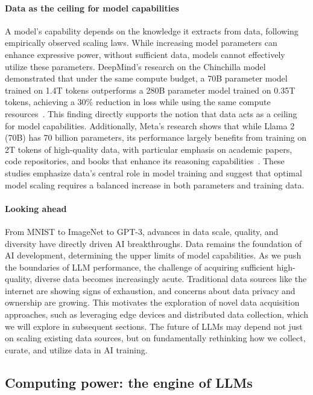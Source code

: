 \paragraph{Data as the ceiling for model capabilities}
A model's capability depends on the knowledge it extracts from data, following empirically observed scaling laws. While increasing model parameters can enhance expressive power, without sufficient data, models cannot effectively utilize these parameters. DeepMind's research on the Chinchilla model demonstrated that under the same compute budget, a 70B parameter model trained on 1.4T tokens outperforms a 280B parameter model trained on 0.35T tokens, achieving a 30\% reduction in loss while using the same compute resources~\cite{hoffmann2022training}. This finding directly supports the notion that data acts as a ceiling for model capabilities. Additionally, Meta's research shows that while Llama 2 (70B) has 70 billion parameters, its performance largely benefits from training on 2T tokens of high-quality data, with particular emphasis on academic papers, code repositories, and books that enhance its reasoning capabilities~\cite{touvron2023llama}. These studies emphasize data's central role in model training and suggest that optimal model scaling requires a balanced increase in both parameters and training data.

\paragraph{Looking ahead}
From MNIST to ImageNet to GPT-3, advances in data scale, quality, and diversity have directly driven AI breakthroughs. Data remains the foundation of AI development, determining the upper limits of model capabilities. As we push the boundaries of LLM performance, the challenge of acquiring sufficient high-quality, diverse data becomes increasingly acute. Traditional data sources like the internet are showing signs of exhaustion, and concerns about data privacy and ownership are growing. This motivates the exploration of novel data acquisition approaches, such as leveraging edge devices and distributed data collection, which we will explore in subsequent sections. The future of LLMs may depend not just on scaling existing data sources, but on fundamentally rethinking how we collect, curate, and utilize data in AI training.

\subsection{Computing power: the engine of LLMs}
